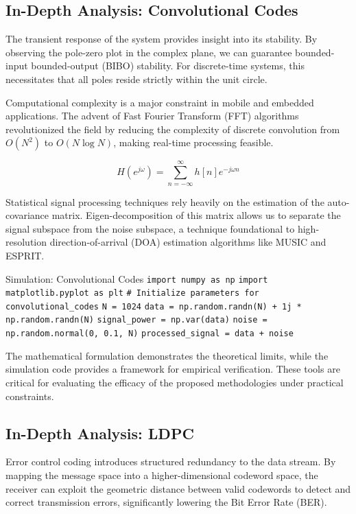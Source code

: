 \subsection{In-Depth Analysis: Convolutional Codes}
The transient response of the system provides insight into its stability. By observing the pole-zero plot in the complex plane, we can guarantee bounded-input bounded-output (BIBO) stability. For discrete-time systems, this necessitates that all poles reside strictly within the unit circle.

Computational complexity is a major constraint in mobile and embedded applications. The advent of Fast Fourier Transform (FFT) algorithms revolutionized the field by reducing the complexity of discrete convolution from $O(N^2)$ to $O(N \log N)$, making real-time processing feasible.

\begin{equation}
    H(e^{j\omega}) = \sum_{n=-\infty}^{\infty} h[n] e^{-j\omega n}
\end{equation}

Statistical signal processing techniques rely heavily on the estimation of the auto-covariance matrix. Eigen-decomposition of this matrix allows us to separate the signal subspace from the noise subspace, a technique foundational to high-resolution direction-of-arrival (DOA) estimation algorithms like MUSIC and ESPRIT.

\begin{pythonbox}{Simulation: Convolutional Codes}
\texttt{import numpy as np}
\texttt{import matplotlib.pyplot as plt}
\texttt{}
\texttt{\# Initialize parameters for convolutional\_codes}
\texttt{N = 1024}
\texttt{data = np.random.randn(N) + 1j * np.random.randn(N)}
\texttt{signal\_power = np.var(data)}
\texttt{noise = np.random.normal(0, 0.1, N)}
\texttt{processed\_signal = data + noise}
\end{pythonbox}

\vspace{0.5cm}
The mathematical formulation demonstrates the theoretical limits, while the simulation code provides a framework for empirical verification. These tools are critical for evaluating the efficacy of the proposed methodologies under practical constraints.


\subsection{In-Depth Analysis: LDPC}
Error control coding introduces structured redundancy to the data stream. By mapping the message space into a higher-dimensional codeword space, the receiver can exploit the geometric distance between valid codewords to detect and correct transmission errors, significantly lowering the Bit Error Rate (BER).

